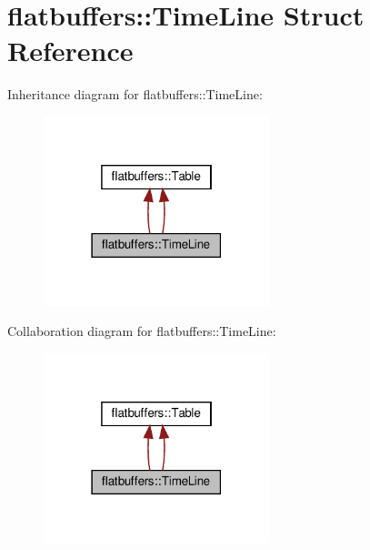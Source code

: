 \hypertarget{structflatbuffers_1_1TimeLine}{}\section{flatbuffers\+:\+:Time\+Line Struct Reference}
\label{structflatbuffers_1_1TimeLine}


Inheritance diagram for flatbuffers\+:\+:Time\+Line\+:
\nopagebreak
\begin{figure}[H]
\begin{center}
\leavevmode
\includegraphics[width=186pt]{structflatbuffers_1_1TimeLine__inherit__graph}
\end{center}
\end{figure}


Collaboration diagram for flatbuffers\+:\+:Time\+Line\+:
\nopagebreak
\begin{figure}[H]
\begin{center}
\leavevmode
\includegraphics[width=186pt]{structflatbuffers_1_1TimeLine__coll__graph}
\end{center}
\end{figure}
